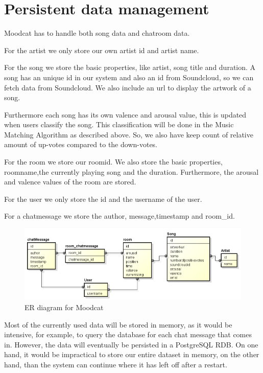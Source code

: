 \section{Persistent data management}
Moodcat has to handle both song data and chatroom data.

\par
For the artist we only store our own artist id and artist name.

\par
For the song we store the basic properties, like artist, song title and duration.
A song has an unique id in our system and also an id from \gls{Soundcloud}, so we can fetch data from Soundcloud.
We also include an url to display the artwork of a song.

Furthermore each song has its own \gls{valence} and \gls{arousal} value, this is updated when users classify the song.
This classification will be done in the Music Matching Algorithm as described above. So, we also have keep count of relative amount of up-votes compared to the down-votes.

\par 
For the room we store our roomid. 
We also store the basic properties, roomname,the currently playing song and the duration.
Furthermore, the arousal and valence values of the room are stored.

\par
For the user we only store the id and the username of the user. 

\par
For a chatmessage we store the author, message,timestamp and room\_id.


\begin{figure}[H]
\includegraphics[scale=.6]{erDiagram.png}
\caption{ER diagram for Moodcat}
\label{fig:ER diagram of the described entities}
\end{figure}

\par
Most of the currently used data will be stored in memory, as it would be intensive, for example, to query the database for each chat message that comes in.
However, the data will eventually be persisted in a PostgreSQL\cite{PostgreSQL} \gls{RDB}.
On one hand, it would be impractical to store our entire dataset in memory, on the other hand, than the system can continue where it has left off after a restart.

